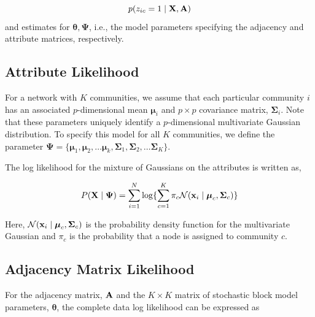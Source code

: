 \documentclass[journal]{IEEEtran}
\begin{document}
\begin{equation}
\label{post}
p(z_{ic}=1\mid {\bf X,A})
\end{equation} 
and estimates for ${\boldsymbol \theta, \boldsymbol \Psi}$, i.e., the model parameters specifying the adjacency and attribute matrices, respectively. 

\subsection{Attribute Likelihood}

For a network with $K$ communities, we assume that each particular community $i$ has an associated $p$-dimensional mean ${\boldsymbol \mu}_{i}$ and $p \times p$ covariance matrix, ${\boldsymbol \Sigma}_{i}$. Note that these parameters uniquely identify a $p$-dimensional multivariate Gaussian distribution. To specify this model for all $K$ communities, we define the parameter ${\boldsymbol \Psi}=\{{\boldsymbol \mu}_{1},{\boldsymbol \mu}_{2},\dots {\boldsymbol \mu}_{k},{\boldsymbol \Sigma}_{1},{\boldsymbol \Sigma}_{2},\dots {\boldsymbol \Sigma}_{K}\}$. 

The log likelihood for the mixture of Gaussians on the attributes is written as,

\begin{equation}
P({\bf X} \mid {\boldsymbol \Psi})=\sum_{i=1}^{N}\log\{\sum_{c=1}^{K}\pi_{c}\mathcal{N}({\bf x}_{i}\mid {\boldsymbol \mu}_{c},{\boldsymbol \Sigma}_{c})   \}
\end{equation}

%
Here, $\mathcal{N}({\bf x}_{i} \mid {\boldsymbol \mu}_{c},{\boldsymbol \Sigma}_{c})$ is the probability density function for the multivariate Gaussian and $\pi_{c}$ is the probability that a node is assigned to community $c$.

\subsection{Adjacency Matrix Likelihood}
For the adjacency matrix, ${\bf A}$ and the $K \times K$ matrix of stochastic block model parameters, ${\boldsymbol \theta}$, the complete data log likelihood can be expressed as
\end{document}
